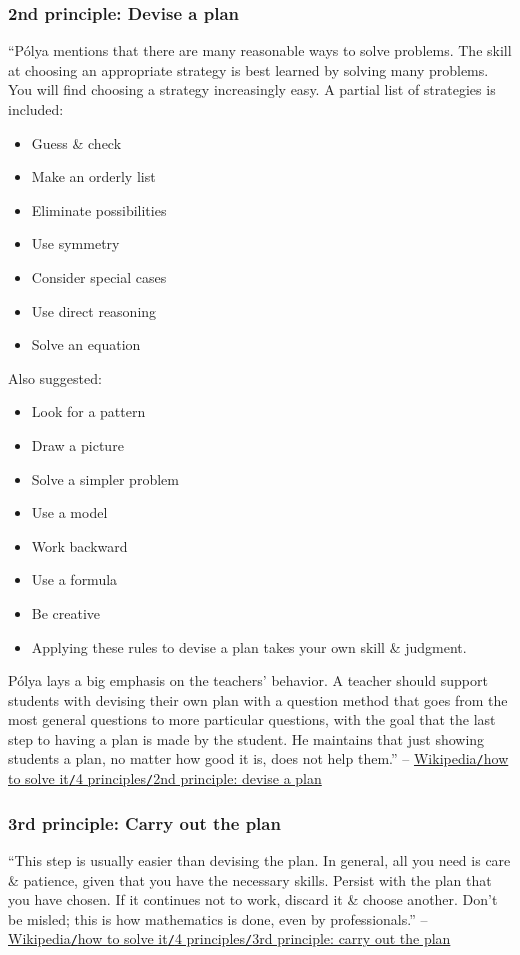 \documentclass[oneside]{book}
\numberwithin{equation}{section}
\begin{document}
\subsubsection{2nd principle: Devise a plan}
``P\'olya mentions that there are many reasonable ways to solve problems. The skill at choosing an appropriate strategy is best learned by solving many problems. You will find choosing a strategy increasingly easy. A partial list of strategies is included:
\begin{itemize}
	\item Guess \& check
	\item Make an orderly list
	\item Eliminate possibilities
	\item Use symmetry
	\item Consider special cases
	\item Use direct reasoning
	\item Solve an equation
\end{itemize}
Also suggested:
\begin{itemize}
	\item Look for a pattern
	\item Draw a picture
	\item Solve a simpler problem
	\item Use a model
	\item Work backward
	\item Use a formula
	\item Be creative
	\item Applying these rules to devise a plan takes your own skill \& judgment.
\end{itemize}
P\'olya lays a big emphasis on the teachers' behavior. A teacher should support students with devising their own plan with a question method that goes from the most general questions to more particular questions, with the goal that the last step to having a plan is made by the student. He maintains that just showing students a plan, no matter how good it is, does not help them.'' -- \href{https://en.wikipedia.org/wiki/How_to_Solve_It#Second_principle:_Devise_a_plan}{Wikipedia\texttt{/}how to solve it\texttt{/}4 principles\texttt{/}2nd principle: devise a plan}

\subsubsection{3rd principle: Carry out the plan}
``This step is usually easier than devising the plan. In general, all you need is care \& patience, given that you have the necessary skills. Persist with the plan that you have chosen. If it continues not to work, discard it \& choose another. Don't be misled; this is how mathematics is done, even by professionals.'' -- \href{https://en.wikipedia.org/wiki/How_to_Solve_It#Third_principle:_Carry_out_the_plan}{Wikipedia\texttt{/}how to solve it\texttt{/}4 principles\texttt{/}3rd principle: carry out the plan}
\end{document}
